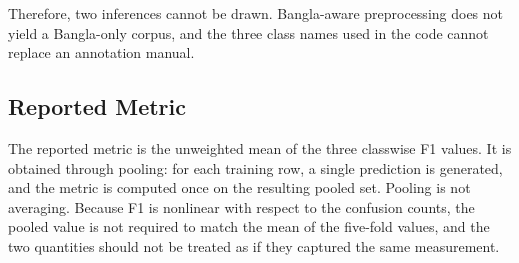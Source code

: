 \documentclass[runningheads]{llncs}
\begin{document}
Therefore, two inferences cannot be drawn. Bangla-aware preprocessing does not yield a Bangla-only corpus, and the three class names used in the code cannot replace an annotation manual.



\subsection{Reported Metric}

The reported metric is the unweighted mean of the three classwise F1 values. It is obtained through pooling: for each training row, a single prediction is generated, and the metric is computed once on the resulting pooled set. Pooling is not averaging. Because F1 is nonlinear with respect to the confusion counts, the pooled value is not required to match the mean of the five-fold values, and the two quantities should not be treated as if they captured the same measurement.










\end{document}
